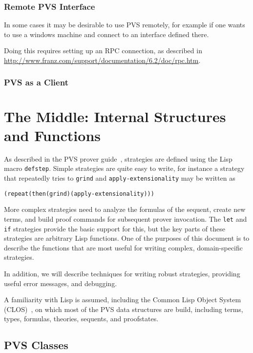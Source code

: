 \documentclass[12pt]{book}
\begin{document}
\subsection{Remote PVS Interface}

In some cases it may be desirable to use PVS remotely, for example if
one wants to use a windows machine and connect to an interface defined
there.

Doing this requires setting up an RPC connection, as described in
\url{http://www.franz.com/support/documentation/6.2/doc/rpc.htm}.

\subsection{PVS as a Client}


\chapter{The Middle: Internal Structures and Functions}

As described in the PVS prover guide~\cite{PVS:prover}, strategies are
defined using the Lisp macro \texttt{defstep}.  Simple strategies are
quite easy to write, for instance a strategy that repeatedly tries to
\texttt{grind} and \texttt{apply-extensionality} may be written as
\begin{alltt}
  (repeat (then (grind) (apply-extensionality)))
\end{alltt}
More complex strategies need to analyze the formulas of the sequent,
create new terms, and build proof commands for subsequent prover
invocation.  The \texttt{let} and \texttt{if} strategies provide the basic
support for this, but the key parts of these strategies are arbitrary Lisp
functions.  One of the purposes of this document is to describe the
functions that are most useful for writing complex, domain-specific
strategies.

In addition, we will describe techniques for writing robust strategies,
providing useful error messages, and debugging.

A familiarity with Lisp is assumed, including the Common Lisp Object
System (CLOS)~\cite{Steele:commonlisp}, on which most of the PVS data
structures are build, including terms, types, formulas, theories,
sequents, and proofstates.

\section{PVS Classes}
\end{document}
